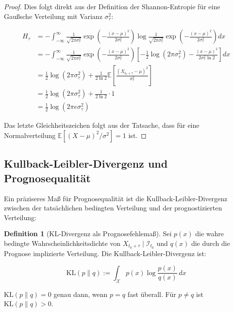 \documentclass[a4paper, 12pt, twoside, openright]{report}
\theoremstyle{definition}
\newtheorem{definition}[theorem]{Definition}
\theoremstyle{definition}
\newcommand{\E}{\mathbb{E}}
\newcommand{\KL}{\mathrm{KL}}
\begin{document}
\begin{proof}
Dies folgt direkt aus der Definition der Shannon-Entropie für eine Gaußsche Verteilung mit Varianz $\sigma_\tau^2$:

\begin{align}
H_\tau &= -\int_{-\infty}^{\infty} \frac{1}{\sqrt{2\pi\sigma_\tau^2}} \exp\left( -\frac{(x-\mu)^2}{2\sigma_\tau^2} \right) \log \frac{1}{\sqrt{2\pi\sigma_\tau^2}} \exp\left( -\frac{(x-\mu)^2}{2\sigma_\tau^2} \right) dx \\
&= -\int_{-\infty}^{\infty} \frac{1}{\sqrt{2\pi\sigma_\tau^2}} \exp\left( -\frac{(x-\mu)^2}{2\sigma_\tau^2} \right) \left[ -\frac{1}{2}\log(2\pi\sigma_\tau^2) - \frac{(x-\mu)^2}{2\sigma_\tau^2\ln 2} \right] dx \\
&= \frac{1}{2}\log(2\pi\sigma_\tau^2) + \frac{1}{2\ln 2} \E\left[ \frac{(X_{t_0+\tau}-\mu)^2}{\sigma_\tau^2} \right] \\
&= \frac{1}{2}\log(2\pi\sigma_\tau^2) + \frac{1}{2\ln 2} \cdot 1 \\
&= \frac{1}{2} \log(2\pi e \sigma_\tau^2)
\end{align}

Das letzte Gleichheitszeichen folgt aus der Tatsache, dass für eine Normalverteilung $\E[(X-\mu)^2/\sigma^2] = 1$ ist.
\end{proof}

\subsection{Kullback-Leibler-Divergenz und Prognosequalität}

Ein präziseres Maß für Prognosequalität ist die Kullback-Leibler-Divergenz zwischen der tatsächlichen bedingten Verteilung und der prognostizierten Verteilung:

\begin{definition}[KL-Divergenz als Prognosefehlemaß]
Sei $p(x)$ die wahre bedingte Wahrscheinlichkeitsdichte von $X_{t_0+\tau} \mid \mathcal{I}_{t_0}$ und $q(x)$ die durch die Prognose implizierte Verteilung. Die Kullback-Leibler-Divergenz ist:

\begin{equation}
\KL(p \parallel q) := \int_{\mathcal{X}} p(x) \log \frac{p(x)}{q(x)} \, dx
\label{eq:kl}
\end{equation}

$\KL(p \parallel q) = 0$ genau dann, wenn $p = q$ fast überall. Für $p \neq q$ ist $\KL(p \parallel q) > 0$.
\end{definition}
\end{document}
